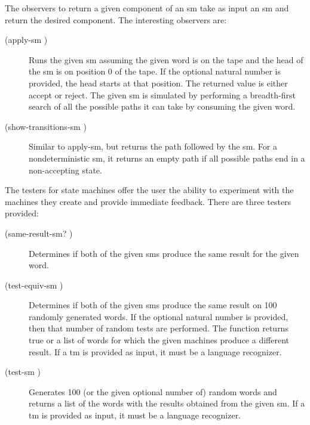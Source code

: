 \documentclass{eptcs}
\begin{document}
The observers to return a given component of an \textsf{sm} take as input an \textsf{sm} and return the desired component. The interesting observers are:
\begin{description}
  \item [(apply-sm   )] Runs the given \textsf{sm} assuming the given word is on the tape and the head of the \textsf{sm} is on position 0 of the tape. If the optional natural number is provided, the head starts at that position. The returned value is either \textquotesingle accept or \textquotesingle reject. The given \textsf{sm} is simulated by performing a breadth-first search of all the possible paths it can take by consuming the given word.

  \item [(show-transitions-sm   )] Similar to \textsf{apply-sm}, but returns the path followed by the \textsf{sm}. For a nondeterministic \textsf{sm}, it returns an empty path if all possible paths end in a non-accepting state.
\end{description}

The testers for state machines offer the user the ability to experiment with the machines they create and provide immediate feedback. There are three testers provided:
\begin{description}
  \item [(same-result-sm?   )] Determines if both of the given \textsf{sm}s produce the same result for the given word.

  \item [(test-equiv-sm   )] Determines if both of the given \textsf{sm}s produce the same result on 100 randomly generated words. If the optional natural number is provided, then that number of random tests are performed. The function returns true or a list of words for which the given machines produce a different result. If a \textsf{tm} is provided as input, it must be a language recognizer.

  \item [(test-sm  )] Generates 100 (or the given optional number of) random words and returns a list of the words with the results obtained from the given \textsf{sm}. If a \textsf{tm} is provided as input, it must be a language recognizer.
\end{description}
\end{document}
